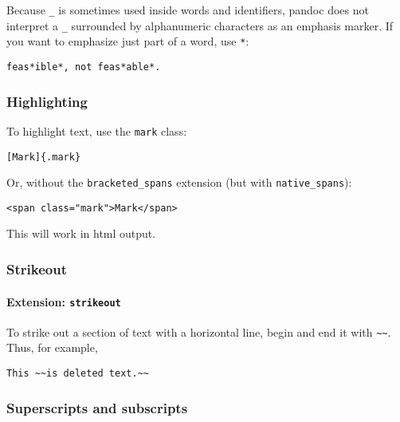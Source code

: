 \documentclass[
]{article}
\begin{document}
Because \texttt{\_} is sometimes used inside words and identifiers,
pandoc does not interpret a \texttt{\_} surrounded by alphanumeric
characters as an emphasis marker. If you want to emphasize just part of
a word, use \texttt{*}:

\begin{verbatim}
feas*ible*, not feas*able*.
\end{verbatim}

\hypertarget{highlighting}{%
\subsubsection{Highlighting}\label{highlighting}}

To highlight text, use the \texttt{mark} class:

\begin{verbatim}
[Mark]{.mark}
\end{verbatim}

Or, without the \texttt{bracketed\_spans} extension (but with
\texttt{native\_spans}):

\begin{verbatim}
<span class="mark">Mark</span>
\end{verbatim}

This will work in html output.

\hypertarget{strikeout}{%
\subsubsection{Strikeout}\label{strikeout}}

\hypertarget{extension-strikeout}{%
\paragraph{\texorpdfstring{Extension:
\texttt{strikeout}}{Extension: strikeout}}\label{extension-strikeout}}

To strike out a section of text with a horizontal line, begin and end it
with \texttt{\textasciitilde{}\textasciitilde{}}. Thus, for example,

\begin{verbatim}
This ~~is deleted text.~~
\end{verbatim}

\hypertarget{superscripts-and-subscripts}{%
\subsubsection{Superscripts and
subscripts}\label{superscripts-and-subscripts}}
\end{document}
